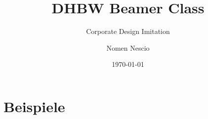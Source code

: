 \documentclass[smaller]{DHBW} %
\title{DHBW Beamer Class}
\subtitle{Corporate Design Imitation}
\author{Nomen Nescio}
\institute[DHBW Karlsruhe]{karlsruhe.dhbw.de}
\date{\today}
\begin{document}
  \part{Beispiele}
  
\end{document}
